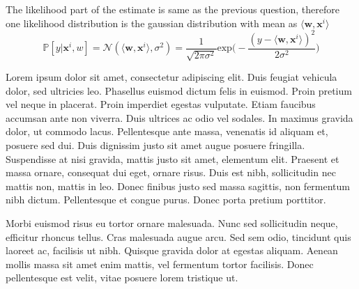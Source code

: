 \documentclass[a4paper,11pt]{article}
\begin{document}
\begin{mlsolution}
The likelihood part of the estimate is same as the previous question, therefore one likelihood distribution is  the gaussian distribution with mean as $\langle \mathbf{w,x}^i \rangle$ \[
\mathbb{P}[y|\mathbf{x}^i,w] = \mathcal{N}(\langle \mathbf{w,x}^i \rangle,\sigma^2) = \frac{1}{\sqrt{2\pi\sigma^2}} \text{exp}\bigg(-\frac{(y-\langle \mathbf{w,x}^i \rangle)^2}{2\sigma^2}\bigg)
\]

\end{mlsolution}

\begin{mlsolution}
 Lorem ipsum dolor sit amet, consectetur adipiscing elit. Duis feugiat vehicula dolor, sed ultricies leo. Phasellus euismod dictum felis in euismod. Proin pretium vel neque in placerat. Proin imperdiet egestas vulputate. Etiam faucibus accumsan ante non viverra. Duis ultrices ac odio vel sodales. In maximus gravida dolor, ut commodo lacus. Pellentesque ante massa, venenatis id aliquam et, posuere sed dui. Duis dignissim justo sit amet augue posuere fringilla. Suspendisse at nisi gravida, mattis justo sit amet, elementum elit. Praesent et massa ornare, consequat dui eget, ornare risus. Duis est nibh, sollicitudin nec mattis non, mattis in leo. Donec finibus justo sed massa sagittis, non fermentum nibh dictum. Pellentesque et congue purus. Donec porta pretium porttitor.

Morbi euismod risus eu tortor ornare malesuada. Nunc sed sollicitudin neque, efficitur rhoncus tellus. Cras malesuada augue arcu. Sed sem odio, tincidunt quis laoreet ac, facilisis ut nibh. Quisque gravida dolor at egestas aliquam. Aenean mollis massa sit amet enim mattis, vel fermentum tortor facilisis. Donec pellentesque est velit, vitae posuere lorem tristique ut. 
\end{mlsolution}
					
\end{document}
